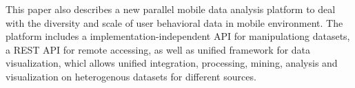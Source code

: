 \begin{eabstract}
  This paper also describes a new parallel mobile data analysis platform to deal with the diversity and scale of user behavioral data in mobile environment. The platform includes a implementation-independent API for manipulationg datasets, a REST API for remote accessing, as well as unified framework for data visualization, whicl allows unified integration, processing, mining, analysis and visualization on heterogenous datasets for different sources.
\end{eabstract}

